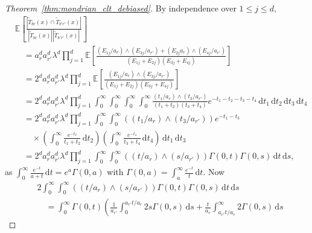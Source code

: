 \documentclass[11pt,lof]{puthesis}
\newcommand{\E}{\ensuremath{\mathbb{E}}}
\newcommand{\diff}[1]{\,\mathrm{d}#1}
\theoremstyle{break}
\theoremstyle{proof}
\newtheorem{proof}{Proof}
\begin{document}
\begin{proof}[Theorem~\ref{thm:mondrian_clt_debiased}]
  By independence over $1 \leq j \leq d$,
  \begin{align*}
    &\E \left[
      \frac{|\tilde T_{b r}(x) \cap \tilde T_{b' r'}(x)|}
      {|\tilde T_{b r}(x)| |\tilde T_{b' r'}(x)|}
    \right] \\
    &\quad=
    a_r^d a_{r'}^d \lambda^d
    \prod_{j=1}^d
    \E \left[
      \frac{ (E_{1j} / a_r) \wedge (E_{3j} / a_{r'})
      + (E_{2j} a_r) \wedge (E_{4j} / a_{r'}) }
      { \left( E_{1j} + E_{2j} \right) \left( E_{3j} + E_{4j} \right)}
    \right] \\
    &\quad=
    2^d a_r^d a_{r'}^d \lambda^d
    \prod_{j=1}^d
    \E \left[
      \frac{ (E_{1j} / a_r) \wedge (E_{3j} / a_{r'})}
      { \left( E_{1j} + E_{2j} \right) \left( E_{3j} + E_{4j} \right) }
    \right] \\
    &\quad=
    2^d a_r^d a_{r'}^d \lambda^d
    \prod_{j=1}^d
    \int_{0}^{\infty}
    \int_{0}^{\infty}
    \int_{0}^{\infty}
    \int_{0}^{\infty}
    \frac{ (t_1 / a_r) \wedge (t_3 / a_{r'}) }
    { \left( t_1 + t_2 \right) \left( t_3 + t_4 \right) }
    e^{-t_1 - t_2 - t_3 - t_4}
    \diff t_1
    \diff t_2
    \diff t_3
    \diff t_4 \\
    &\quad=
    2^d a_r^d a_{r'}^d \lambda^d
    \prod_{j=1}^d
    \int_{0}^{\infty}
    \int_{0}^{\infty}
    ((t_1 / a_r) \wedge (t_3 / a_{r'}))
    e^{-t_1 - t_3} \\
    &\qquad\times
    \left(
      \int_{0}^{\infty}
      \frac{e^{-t_2}}{t_1 + t_2}
      \diff t_2
    \right)
    \left(
      \int_{0}^{\infty}
      \frac{e^{-t_4}}{t_3 + t_4}
      \diff t_4
    \right)
    \diff t_1
    \diff t_3 \\
    &\quad=
    2^d a_r^d a_{r'}^d \lambda^d
    \prod_{j=1}^d
    \int_{0}^{\infty}
    \int_{0}^{\infty}
    ((t / a_r) \wedge (s / a_{r'}))
    \Gamma(0, t)
    \Gamma(0, s)
    \diff t
    \diff s,
  \end{align*}
  as $\int_0^\infty \frac{e^{-t}}{a + t} \diff t = e^a \Gamma(0, a)$
  with $\Gamma(0, a) = \int_a^\infty \frac{e^{-t}}{t} \diff t$. Now
  \begin{align*}
    &2
    \int_{0}^{\infty}
    \int_{0}^{\infty}
    ((t / a_r) \wedge (s / a_{r'}))
    \Gamma(0, t)
    \Gamma(0, s)
    \diff t
    \diff s \\
    &\quad=
    \int_0^\infty
    \Gamma(0, t)
    \left(
      \frac{1}{a_{r'}}
      \int_0^{a_{r'} t / a_r}
      2 s \Gamma(0, s)
      \diff{s}
      +
      \frac{t}{a_r}
      \int_{a_{r'} t / a_r}^\infty
      2 \Gamma(0, s)
      \diff{s}

\end{align*}
\end{proof}
\end{document}
